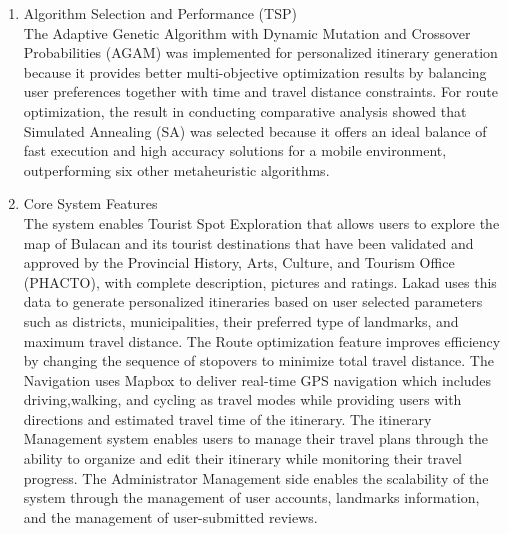 \begin{enumerate}
	\item Algorithm Selection and Performance (TSP)\\
	The Adaptive Genetic Algorithm with Dynamic Mutation and Crossover Probabilities (AGAM) was implemented for personalized itinerary generation because it provides better multi-objective optimization results by balancing user preferences together with time and travel distance constraints. For route optimization, the result in conducting comparative analysis showed that Simulated Annealing (SA) was selected because it offers an ideal balance of fast execution and high accuracy solutions for a mobile environment, outperforming six other metaheuristic algorithms.	

	\item Core System Features\\
	The system enables Tourist Spot Exploration that allows users to explore the map of Bulacan and its tourist destinations that have been validated and approved by the Provincial History, Arts, Culture, and Tourism Office (PHACTO), with complete description, pictures and ratings. Lakad uses this data to generate personalized itineraries based on user selected parameters such as districts, municipalities, their preferred type of landmarks, and maximum travel distance. The Route optimization feature improves efficiency by changing the sequence of stopovers to minimize total travel distance. The Navigation uses Mapbox to deliver real-time GPS navigation which includes driving,walking, and cycling as travel modes while providing users with directions and estimated travel time of the itinerary. The itinerary Management system enables users to manage their travel plans through the ability to organize and edit their itinerary while monitoring their travel progress. The Administrator Management side enables the scalability of the system through the management of user accounts, landmarks information, and the management of user-submitted reviews.


\end{enumerate}
